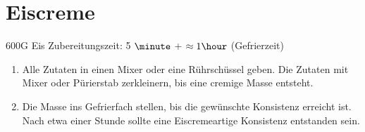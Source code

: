 \chapter{Eiscreme}
600G Eis \hfill Zubereitungszeit: 5 $\minute$ + $\approx1 \hour$ (Gefrierzeit)
\begin{enumerate}
\item	Alle Zutaten in einen Mixer oder eine Rührschüssel geben.
	Die Zutaten mit Mixer oder Pürierstab zerkleinern, bis eine cremige Masse entsteht.
\item   Die Masse ins Gefrierfach stellen, bis die gewünschte Konsistenz erreicht ist.
	Nach etwa einer Stunde sollte eine Eiscremeartige Konsistenz entstanden sein.
\end{enumerate}
